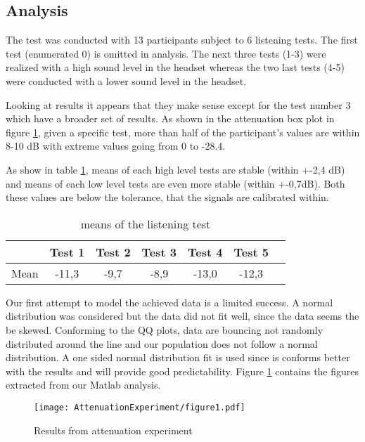 \subsection{Analysis}

The test was conducted with 13 participants subject to 6 listening tests. The first test (enumerated 0) is omitted in analysis. The next three tests (1-3) were realized with a high sound level in the headset whereas the two last tests (4-5) were conducted with a lower sound level in the headset. 

Looking at results it appears that they make sense except for the test number 3 which have a broader set of results. As shown in the attenuation box plot in figure \ref{fig:ResAttExp}, given a specific test, more than half of the participant's values are within 8-10 dB with extreme values going from 0 to -28.4.

As show in table \ref{tab:MeanListeningResults}, means of each high level tests are stable (within +-2,4 dB) and means of each low level tests are even more stable (within +-0,7dB). Both these values are below the tolerance, that the signals are calibrated within. 

\begin{table}[H]
	\centering
	\begin{tabular}{*{7}{c}}
		\hline
		& Test 1 & Test 2 & Test 3  & Test 4  & Test 5  
		\\
		\hline
		Mean & -11,3 & -9,7 & -8,9	 & -13,0 & -12,3 \\
		\hline
	\end{tabular}
	\caption{means of the listening test}
	\label{tab:MeanListeningResults}
\end{table}

Our first attempt to model the achieved data is a limited success. A normal distribution was considered but the data did not fit well, since the data seems the be skewed. Conforming to the QQ plots, data are bouncing not randomly distributed around the line and our population does not follow a normal distribution. A one sided normal distribution fit is used since is conforms better with the results and will provide good predictability. Figure \ref{fig:ResAttExp} contains the figures extracted from our Matlab analysis.


\begin{figure}[H]
	\centering
	\texttt{[image: AttenuationExperiment/figure1.pdf]}
	\caption{Results from attenuation experiment}
	\label{fig:ResAttExp}
\end{figure}

